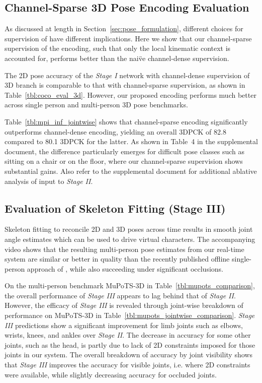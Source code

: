 \documentclass[acmtog,authorversion]{acmart}
\begin{document}
\subsection{Channel-Sparse 3D Pose Encoding Evaluation}
\label{sec:sparse_v_dense}
As discussed at length in Section~\ref{sec:pose_formulation}, different choices for supervision of  have different implications. Here we show that our channel-sparse supervision of the encoding, such that only the local kinematic context is accounted for, performs better than the nai\"ve channel-dense supervision. 

The 2D pose accuracy of the \textit{Stage I} network with channel-dense supervision of 3D branch is comparable to that with channel-sparse supervision, as shown in Table~\ref{tbl:coco_eval_3d}. However, our proposed encoding performs much better across single person and multi-person 3D pose benchmarks. 

Table~\ref{tbl:mpi_inf_jointwise} shows that channel-sparse encoding significantly outperforms channel-dense encoding, yielding an overall 3DPCK of 82.8 compared to 80.1 3DPCK for the latter. As shown in Table~4 in the supplemental document, the difference particularly emerges for difficult pose classes such as sitting on a chair or on the floor, where our channel-sparse supervision shows substantial gains. Also refer to the supplemental document for additional ablative analysis of input to \textit{Stage II}.

\subsection{Evaluation of Skeleton Fitting (Stage III)}
Skeleton fitting to reconcile 2D and 3D poses across time results in smooth joint angle estimates which can be used to drive virtual characters. The accompanying video shows that the resulting multi-person pose estimates from our real-time system are similar or better in quality than the recently published offline single-person approach of \cite{humanMotionKanazawa19}, while also succeeding under significant occlusions.

On the multi-person benchmark MuPoTS-3D in Table~\ref{tbl:mupots_comparison}, the overall performance of \emph{Stage III} appears to lag behind that of \emph{Stage II}.
However, the efficacy of \emph{Stage III} is revealed through joint-wise breakdown of performance on MuPoTS-3D in Table~\ref{tbl:mupots_jointwise_comparison}. \emph{Stage III} predictions show a significant improvement for limb joints such as elbows, wrists, knees, and ankles over \emph{Stage II}. The decrease in accuracy for some other joints, such as the head, is partly due to lack of 2D constraints imposed for those joints in our system. 
The overall breakdown of accuracy by joint visibility shows that \emph{Stage III} improves the accuracy for visible joints, i.e. where 2D constraints were available, while slightly decreasing accuracy for occluded joints.
\end{document}
